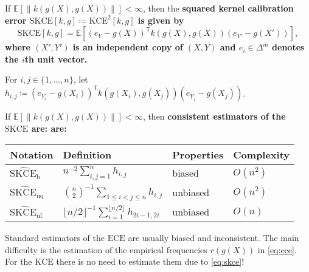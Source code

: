 \documentclass[10pt]{article}
\newcommand{\hl}[1]{\begingroup\bfseries\boldmath\color{uured}#1\endgroup}
\newcommand*{\Expect}{\mathbb{E}}
\newcommand*{\transpose}[1]{{#1}^{\mathsf{T}}}
\newcommand*{\ECE}{\mathup{ECE}}
\newcommand*{\kernelmeasure}{\mathup{KCE}}
\newcommand*{\squaredkernelmeasure}{\mathup{SKCE}}
\newcommand*{\biasedestimator}{\widehat{\mathup{SKCE}}_{\mathup{b}}}
\newcommand*{\unbiasedestimator}{\widehat{\mathup{SKCE}}_{\mathup{uq}}}
\newcommand*{\linearestimator}{\widehat{\mathup{SKCE}}_{\mathup{ul}}}
\begin{document}
\begin{tcbposter}
{    \begin{tcolorbox}[colback=blondstark]
      If $\Expect[\|k(g(X), g(X))\|] < \infty$, then the \hl{squared kernel
      calibration error}
      $\squaredkernelmeasure[k, g] \coloneqq \kernelmeasure^2[k,g]$ is
      given by
      \begin{equation}\label{eq:skce}
        \squaredkernelmeasure[k, g] = \Expect\left[\transpose{(e_Y - g(X))} k(g(X), g(X)) {(e_{Y'} - g(X'))} \right],
      \end{equation}
      where $(X', Y')$ is an independent copy of $(X, Y)$ and
      $e_i \in \Delta^m$ denotes the $i$th unit vector.
    \end{tcolorbox}

    For $i,j \in \{1,\ldots,n\}$, let
    $h_{i,j} \coloneqq \transpose{(e_{Y_i} - g(X_i))} k(g(X_i), g(X_j)) (e_{Y_j} - g(X_j))$.

    \begin{tcolorbox}[colback=blondstark]
      If $\Expect[\|k(g(X),g(X))\|] < \infty$, then \hl{consistent estimators}
      of the $\squaredkernelmeasure$ are:
     are:
      \begin{center}
        \begin{tabular}{llll} \toprule
          Notation & Definition & Properties & Complexity\\ \midrule
          $\biasedestimator$ & $n^{-2} \sum_{i,j=1}^n h_{i,j}$ & biased & $O(n^2)$ \\
          $\unbiasedestimator$ & $ {\binom{n}{2}}^{-1} \sum_{1 \leq i < j \leq n} h_{i,j}$ & unbiased & $O(n^2)$ \\
          $\linearestimator$ & $ {\lfloor n/2\rfloor}^{-1} \sum_{i = 1}^{\lfloor n / 2\rfloor} h_{2i-1,2i}$ & unbiased & $O(n)$ \\ \bottomrule
        \end{tabular}
      \end{center}
    \end{tcolorbox}


    Standard estimators of the $\ECE$ are usually biased and inconsistent.
    The main difficulty is the estimation of the empirical frequencies
    $r(g(X))$ in \cref{eq:ece}. For the $\kernelmeasure$ there is no need
    to estimate them due to \cref{eq:skce}!
  }

\end{tcbposter}
\end{document}
